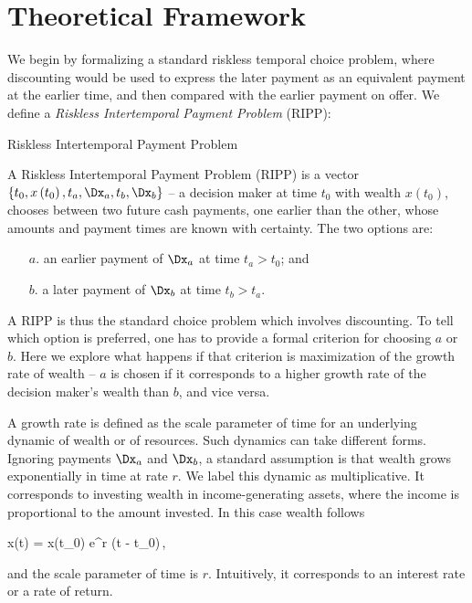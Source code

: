 \section{Theoretical Framework}\label{sec:model}

We begin by formalizing a standard riskless temporal choice problem, where discounting would be used to express the later payment as an equivalent payment at the earlier time, and then compared with the earlier payment on offer. We define a {\it Riskless Intertemporal Payment Problem} (RIPP):

\begin{definition}{Riskless Intertemporal Payment Problem}

A Riskless Intertemporal Payment Problem (RIPP) is a vector $\{t_0,x\left(t_0\right),t_a,\Dx_a,t_b,\Dx_b\}$ -- a decision maker at time $t_0$ with wealth $x\left(t_0\right)$, chooses between two future cash payments, one earlier than the other, whose amounts and payment times are known with certainty. The two options are:

\begin{enumerate}
\item[$a$.] an earlier payment of $\Dx_a$ at time $t_a>t_0$; and
\item[$b$.] a later payment of $\Dx_b$ at time $t_b>t_a$.
\end{enumerate}

\end{definition}

A RIPP is thus the standard choice problem which involves discounting. To tell which option is preferred, one has to provide a formal criterion for choosing $a$ or $b$. Here we explore what happens if that criterion is maximization of the growth rate of wealth -- \ie $a$ is chosen if it corresponds to a higher growth rate of the decision maker's wealth than $b$, and vice versa.

A growth rate is defined as the scale parameter of time for an underlying dynamic of wealth or of resources. Such dynamics can take different forms. Ignoring payments $\Dx_a$ and $\Dx_b$, a standard assumption is that wealth grows exponentially in time at rate $r$. We label this dynamic as multiplicative. It corresponds to investing wealth in income-generating assets, where the income is proportional to the amount invested. In this case wealth follows

\be
x\left(t\right) = x\left(t_0\right) e^{r \left(t - t_0\right)}\,,
\ee

and the scale parameter of time is $r$. Intuitively, it corresponds to an interest rate or a rate of return.

